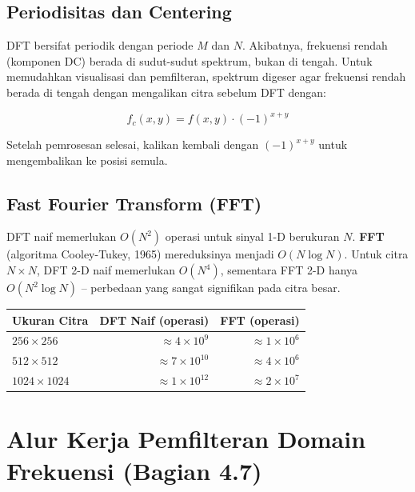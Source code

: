 \documentclass[12pt,a4paper]{article}
\begin{document}
\subsection{Periodisitas dan Centering}

DFT bersifat periodik dengan periode $M$ dan $N$. Akibatnya, frekuensi rendah
(komponen DC) berada di sudut-sudut spektrum, bukan di tengah. Untuk memudahkan
visualisasi dan pemfilteran, spektrum digeser agar frekuensi rendah berada di
tengah dengan mengalikan citra sebelum DFT dengan:

\begin{equation}
  f_c(x,y) = f(x,y) \cdot (-1)^{x+y}
  \label{eq:centering}
\end{equation}

Setelah pemrosesan selesai, kalikan kembali dengan $(-1)^{x+y}$ untuk
mengembalikan ke posisi semula.

\subsection{Fast Fourier Transform (FFT)}

DFT naif memerlukan $O(N^2)$ operasi untuk sinyal 1-D berukuran $N$.
\textbf{FFT} (algoritma Cooley-Tukey, 1965) mereduksinya menjadi $O(N \log N)$.
Untuk citra $N \times N$, DFT 2-D naif memerlukan $O(N^4)$, sementara FFT 2-D
hanya $O(N^2 \log N)$ -- perbedaan yang sangat signifikan pada citra besar.

\begin{center}
\renewcommand{\arraystretch}{1.3}
\begin{tabular}{lrr}
\toprule
\textbf{Ukuran Citra} & \textbf{DFT Naif (operasi)} & \textbf{FFT (operasi)} \\
\midrule
$256 \times 256$   & $\approx 4 \times 10^{9}$  & $\approx 1 \times 10^{6}$ \\
$512 \times 512$   & $\approx 7 \times 10^{10}$ & $\approx 4 \times 10^{6}$ \\
$1024 \times 1024$ & $\approx 1 \times 10^{12}$ & $\approx 2 \times 10^{7}$ \\
\bottomrule
\end{tabular}
\end{center}

\section{Alur Kerja Pemfilteran Domain Frekuensi (Bagian 4.7)}
\end{document}
